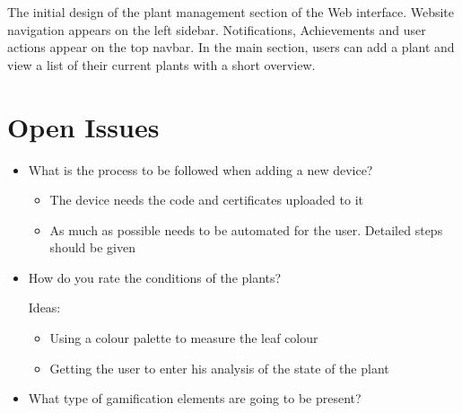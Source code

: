 \documentclass{article}
\begin{document}
The initial design of the plant management section of the Web interface. Website navigation appears on the left sidebar. Notifications, Achievements and user actions appear on the top navbar. In the main section, users can add a plant and view a list of their current plants with a short overview.

\section{Open Issues}
\begin{itemize}
	\item What is the process to be followed when adding a new device?
	
	\begin{itemize}
		\item The device needs the code and certificates uploaded to it
		\item As much as possible needs to be automated for the user. Detailed steps should be given
	\end{itemize}

	\item How do you rate the conditions of the plants?
	
	Ideas:
	\begin{itemize}
		\item Using a colour palette to measure the leaf colour
		\item Getting the user to enter his analysis of the state of the plant
	\end{itemize}
	
	\item What type of gamification elements are going to be present?
\end{itemize}
\end{document}
